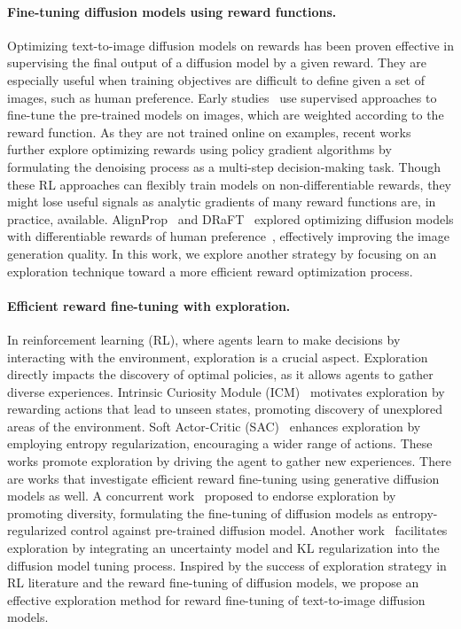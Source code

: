 \paragraph{Fine-tuning diffusion models using reward functions.}
Optimizing text-to-image diffusion models on rewards has been proven effective in supervising the final output of a diffusion model by a given reward. They are especially useful when training objectives are difficult to define given a set of images, such as human preference. Early studies~\cite{align_t2i} use supervised approaches to fine-tune the pre-trained models on images, which are weighted according to the reward function. As they are not trained online on examples, recent works~\cite{ddpo, dpok} further explore optimizing rewards using policy gradient algorithms by formulating the denoising process as a multi-step decision-making task. Though these RL approaches can flexibly train models on non-differentiable rewards, they might lose useful signals as analytic gradients of many reward functions are, in practice, available. AlignProp~\cite{alignprop} and DRaFT~\cite{draft} explored optimizing diffusion models with differentiable rewards of human preference~\cite{pickscore, hps}, effectively improving the image generation quality. 
In this work, we explore another strategy by focusing on an exploration technique toward a more efficient reward optimization process.


\paragraph{Efficient reward fine-tuning with exploration.}
In reinforcement learning (RL), where agents learn to make decisions by interacting with the environment, exploration is a crucial aspect. 
Exploration directly impacts the discovery of optimal policies, as it allows agents to gather diverse experiences. 
Intrinsic Curiosity Module (ICM)~\citep{icm} motivates exploration by rewarding actions that lead to unseen states, promoting discovery of unexplored areas of the environment.
Soft Actor-Critic (SAC)~\citep{sac} enhances exploration by employing entropy regularization, encouraging a wider range of actions. 
These works promote exploration by driving the agent to gather new experiences. 
There are works that investigate efficient reward fine-tuning using generative diffusion models as well.
A concurrent work~\citep{sergey1} proposed to endorse exploration by promoting diversity, formulating the fine-tuning of diffusion models as entropy-regularized control against pre-trained diffusion model.
Another work~\citep{sergey2} facilitates exploration by integrating an uncertainty model and KL regularization into the diffusion model tuning process.
Inspired by the success of exploration strategy in RL literature and the reward fine-tuning of diffusion models, we propose an effective exploration method for reward fine-tuning of text-to-image diffusion models.